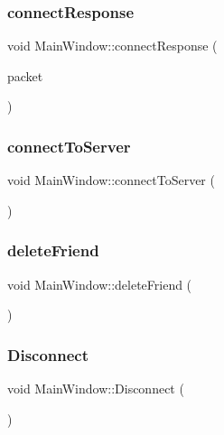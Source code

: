 \subsubsection{\texorpdfstring{connect\+Response}{connectResponse}}
{\footnotesize\ttfamily void Main\+Window\+::connect\+Response (\begin{DoxyParamCaption}\item[{I\+Packet \&}]{packet }\end{DoxyParamCaption})\hspace{0.3cm}{\ttfamily [slot]}}

\mbox{\label{classMainWindow_abfedef9edae209df536e8c1c7cf0e7ae}} 
\subsubsection{\texorpdfstring{connect\+To\+Server}{connectToServer}}
{\footnotesize\ttfamily void Main\+Window\+::connect\+To\+Server (\begin{DoxyParamCaption}{ }\end{DoxyParamCaption})\hspace{0.3cm}{\ttfamily [slot]}}

\mbox{\label{classMainWindow_a9afb210ce554fd18f4e6a88f9348d277}} 
\subsubsection{\texorpdfstring{delete\+Friend}{deleteFriend}}
{\footnotesize\ttfamily void Main\+Window\+::delete\+Friend (\begin{DoxyParamCaption}{ }\end{DoxyParamCaption})\hspace{0.3cm}{\ttfamily [slot]}}

\mbox{\label{classMainWindow_a4c998ea4be4f3f4ead67e5af459b89de}} 
\subsubsection{\texorpdfstring{Disconnect}{Disconnect}}
{\footnotesize\ttfamily void Main\+Window\+::\+Disconnect (\begin{DoxyParamCaption}{ }\end{DoxyParamCaption})\hspace{0.3cm}{\ttfamily [slot]}}

